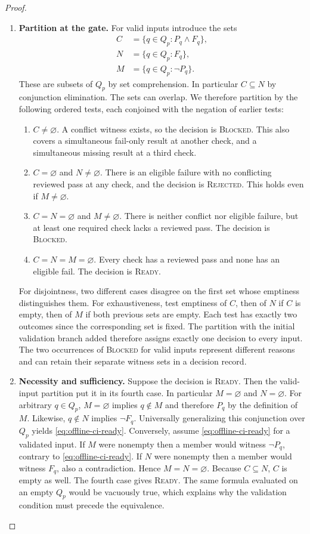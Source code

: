 \begin{proof}
\begin{enumerate}
\item \textbf{Partition at the gate.}
For valid inputs introduce the sets
\begin{align}
   C &= \{q\in Q_p : P_q \land F_q\},
      \label{eq:offline-ci-conflict}\\
   N &= \{q\in Q_p : F_q\},
      \label{eq:offline-ci-negative}\\
   M &= \{q\in Q_p : \neg P_q\}.
      \label{eq:offline-ci-missing}
\end{align}
These are subsets of $Q_p$ by set comprehension.
In particular $C\subseteq N$ by conjunction elimination.
The sets can overlap. We therefore partition by the following
ordered tests, each conjoined with the negation of earlier tests:
\begin{enumerate}
\item $C\ne\varnothing$.
A conflict witness exists, so the decision is \textsc{Blocked}.
This also covers a simultaneous fail-only result at another
check, and a simultaneous missing result at a third check.
\item $C=\varnothing$ and $N\ne\varnothing$.
There is an eligible failure with no conflicting reviewed
pass at any check, and the decision is \textsc{Rejected}.
This holds even if $M\ne\varnothing$.
\item $C=N=\varnothing$ and $M\ne\varnothing$.
There is neither conflict nor eligible failure,
but at least one required check lacks a reviewed pass.
The decision is \textsc{Blocked}.
\item $C=N=M=\varnothing$.
Every check has a reviewed pass and none has an eligible fail.
The decision is \textsc{Ready}.
\end{enumerate}
For disjointness, two different cases disagree on the first
set whose emptiness distinguishes them.
For exhaustiveness, test emptiness of $C$, then of $N$ if $C$
is empty, then of $M$ if both previous sets are empty.
Each test has exactly two outcomes since the corresponding
set is fixed.
The partition with the initial validation branch added
therefore assigns exactly one decision to every input.
The two occurrences of \textsc{Blocked} for valid inputs
represent different reasons and can retain their separate
witness sets in a decision record.

\item \textbf{Necessity and sufficiency.}
Suppose the decision is \textsc{Ready}.
Then the valid-input partition put it in its fourth case.
In particular $M=\varnothing$ and $N=\varnothing$.
For arbitrary $q\in Q_p$, $M=\varnothing$ implies
$q\notin M$ and therefore $P_q$ by the definition of $M$.
Likewise, $q\notin N$ implies $\neg F_q$.
Universally generalizing this conjunction over $Q_p$
yields \eqref{eq:offline-ci-ready}.
Conversely, assume \eqref{eq:offline-ci-ready}
for a validated input.
If $M$ were nonempty then a member would witness
$\neg P_q$, contrary to \eqref{eq:offline-ci-ready}.
If $N$ were nonempty then a member would witness
$F_q$, also a contradiction.
Hence $M=N=\varnothing$.
Because $C\subseteq N$, $C$ is empty as well.
The fourth case gives \textsc{Ready}.
The same formula evaluated on an empty $Q_p$ would be
vacuously true, which explains why the validation condition
must precede the equivalence.


\end{enumerate}
\end{proof}
